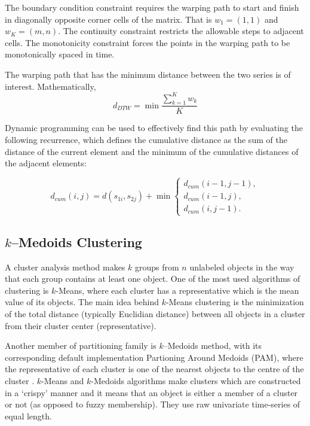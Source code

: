 The boundary condition constraint requires the warping path to start and finish in diagonally opposite corner cells of the matrix. That is $w_{1} = (1, 1)$ and $w_{K} = (m, n)$. The continuity constraint restricts the allowable steps to adjacent cells. The monotonicity constraint forces the points in the warping path to be monotonically spaced in time. 

The warping path that has the minimum distance between the two series is of interest. Mathematically, 
\begin{equation}
d_{DTW} = \min \frac{\sum_{k=1}^{K} w_{k}}{K}
\end{equation}

Dynamic programming can be used to effectively find this path by evaluating the following recurrence, which defines the cumulative distance as the sum of the distance of the current element and the minimum of the cumulative distances of the adjacent elements:

\begin{equation}
d_{cum}(i,j) = d(s_{1i}, s_{2j}) + \min\left\{\begin{array}{l}
                                                d_{cum} (i-1, j-1),\\
                                                d_{cum} (i-1, j ),\\
                                                d_{cum} (i, j-1).
                                                \end{array}
                                                \right.
\end{equation}


\subsection{$k$--Medoids Clustering }
\label{Sec:kMedoidsClustering}

A cluster analysis method makes $k$ groups from $n$ unlabeled objects in the way that each group contains at least one object. One of the most used algorithms of clustering is $k$-Means, where each cluster has a representative which is the mean value of its objects. The main idea behind $k$-Means clustering is the minimization of the total distance (typically Euclidian distance) between all objects in a cluster from their cluster center (representative).

Another member of partitioning family is $k$--Medoids method, with its corresponding default implementation  Partioning Around Medoids (PAM), where the representative of each cluster is one of the nearest objects to the centre of the cluster \cite{Kaufman2009}. $k$-Means and $k$-Medoids algorithms make clusters which are constructed in a `crispy' manner and it means that an object is either a member of a cluster or not (as opposed to fuzzy membership). They use raw univariate time-series of equal length.

